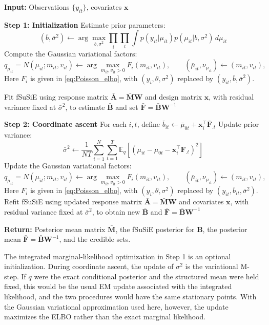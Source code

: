 \begin{algorithm}[H]
\caption{Learning Algorithm for Poisson fSuSiE}\label{alg:SplitVA_fsusie}
\begin{algorithmic}
\STATE \textbf{Input:} Observations $\{y_{it}\}$, covariates $\bm{x}$
 

\STATE \textbf{Step 1: Initialization}
\STATE Estimate prior parameters:
\[
(\bar{b}, \bar{\sigma}^2) \gets \arg\max_{b, \sigma^2} \prod_i \prod_t\int p(y_{it}|\mu_{it})p(\mu_{it}|b,\sigma^2) \, d\mu_{it}
\]
\STATE Compute the Gaussian variational factors:
\[
q_{\mu_{it}}=N(\mu_{it};m_{it},v_{it})
\gets \arg\max_{m_{it},v_{it}>0} F_i(m_{it},v_{it}),
\qquad (\bar{\mu}_{it},\nu_{\mu_{it}})\gets(m_{it},v_{it}),
\]
\STATE Here $F_i$ is given in \eqref{eq:Poisson_elbo}, with $(y_i,\theta,\sigma^2)$ replaced by $(y_{it},\bar b,\bar\sigma^2)$.

\STATE Fit fSuSiE using response matrix $\bar{\bm A}=\bar{\bm M}\bm W$ and design matrix $\bm{x}$, with residual variance fixed at $\bar{\sigma}^2$, to estimate $\bar{\bm B}$ and set $\bar{\bm F}=\bar{\bm B}\bm W^{-1}$

\STATE \textbf{Step 2: Coordinate ascent}
    \STATE For each $i,t$, define $\bar{b}_{it} \gets \bar\mu_{0t} + \bm{x}_i^\top \bar{\bm{F}}_{.t}$
    \STATE Update prior variance:
    \[
    \bar{\sigma}^2 \gets \frac{1}{NT}\sum_{i=1}^N\sum_{t=1}^T
    \mathbb E_q\!\left[\left(\mu_{it}-\mu_{0t}-\bm{x}_i^\top\bm F_{.t}\right)^2\right]
    \]
    \STATE Update the Gaussian variational factors:
    \[
    q_{\mu_{it}}=N(\mu_{it};m_{it},v_{it})
    \gets \arg\max_{m_{it},v_{it}>0} F_i(m_{it},v_{it}),
    \qquad (\bar{\mu}_{it},\nu_{\mu_{it}})\gets(m_{it},v_{it}),
    \]
    \STATE Here $F_i$ is given in \eqref{eq:Poisson_elbo}, with $(y_i,\theta,\sigma^2)$ replaced by $(y_{it},\bar b_{it},\bar\sigma^2)$.
    \STATE Refit fSuSiE using updated response matrix $\bar{\bm A}=\bar{\bm M}\bm W$ and covariates $\bm{x}$, with residual variance fixed at $\bar{\sigma}^2$, to obtain new $\bar{\bm B}$ and $\bar{\bm F}=\bar{\bm B}\bm W^{-1}$
\EndWhile

\STATE \textbf{Return:} Posterior mean matrix $\bar{\bm{M}}$, the fSuSiE posterior for $\bm B$, the posterior mean $\bar{\bm F}=\bar{\bm B}\bm W^{-1}$, and the credible sets.
\end{algorithmic}
\end{algorithm}

The integrated marginal-likelihood optimization in Step 1 is an optional initialization. During coordinate ascent, the update of $\sigma^2$ is the variational M-step. If $q$ were the exact conditional posterior and the structured mean were held fixed, this would be the usual EM update associated with the integrated likelihood, and the two procedures would have the same stationary points. With the Gaussian variational approximation used here, however, the update maximizes the ELBO rather than the exact marginal likelihood.


